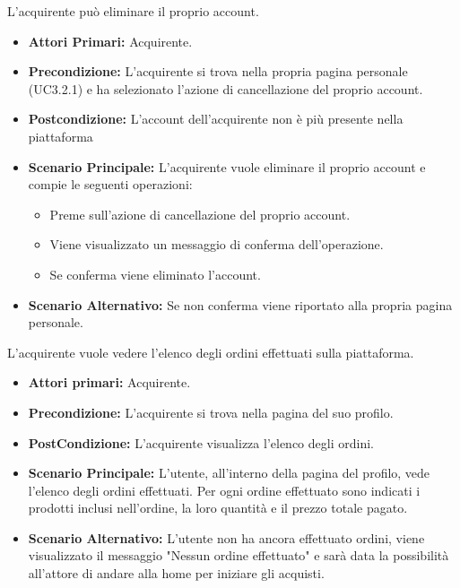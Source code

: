 L'acquirente può eliminare il proprio account.
\begin{itemize}
    \item \textbf{Attori Primari:} Acquirente.
    \item \textbf{Precondizione:} L'acquirente si trova nella propria pagina personale (UC3.2.1) e ha selezionato l'azione di cancellazione del proprio account. 
    \item \textbf{Postcondizione:} L'account dell'acquirente non è più presente nella piattaforma
    \item \textbf{Scenario Principale:} L'acquirente vuole eliminare il proprio account e compie le seguenti operazioni:
    \begin{itemize}
        \item Preme sull'azione di cancellazione del proprio account.
        \item Viene visualizzato un messaggio di conferma dell'operazione.
        \item Se conferma viene eliminato l'account.
    \end{itemize}
    \item \textbf{Scenario Alternativo:} Se non conferma viene riportato alla propria pagina personale.
\end{itemize}

L'acquirente vuole vedere l'elenco degli ordini effettuati sulla piattaforma.
\begin{itemize}
    \item \textbf{Attori primari:} Acquirente.
    \item \textbf{Precondizione:} L'acquirente si trova nella pagina del suo profilo.
    \item \textbf{PostCondizione:} L'acquirente visualizza l'elenco degli ordini.
    \item \textbf{Scenario Principale:} L'utente, all'interno della pagina del profilo, vede l'elenco degli ordini effettuati.
        Per ogni ordine effettuato sono indicati i prodotti inclusi nell'ordine, la loro quantità e il prezzo totale pagato.
    \item \textbf{Scenario Alternativo:} L'utente non ha ancora effettuato ordini, viene visualizzato il messaggio "Nessun ordine effettuato" e sarà data la possibilità all'attore di andare alla home per iniziare gli acquisti.
\end{itemize}
